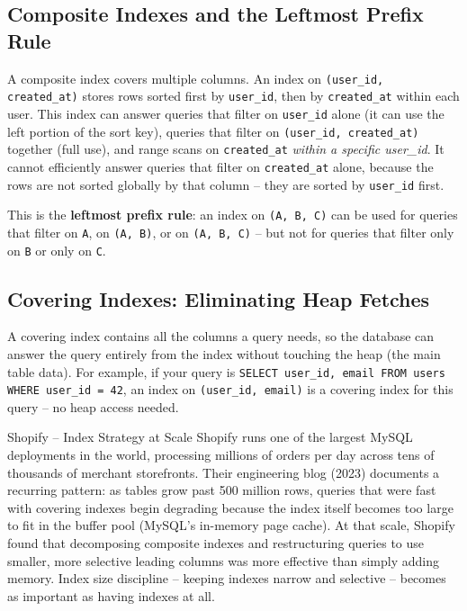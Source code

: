 \documentclass[11pt,a4paper]{article}
\begin{document}
\subsection{Composite Indexes and the Leftmost Prefix Rule}

A composite index covers multiple columns. An index on \texttt{(user\_id, created\_at)} stores rows sorted first by \texttt{user\_id}, then by \texttt{created\_at} within each user. This index can answer queries that filter on \texttt{user\_id} alone (it can use the left portion of the sort key), queries that filter on \texttt{(user\_id, created\_at)} together (full use), and range scans on \texttt{created\_at} \emph{within a specific user\_id}. It cannot efficiently answer queries that filter on \texttt{created\_at} alone, because the rows are not sorted globally by that column -- they are sorted by \texttt{user\_id} first.

This is the \textbf{leftmost prefix rule}: an index on \texttt{(A, B, C)} can be used for queries that filter on \texttt{A}, on \texttt{(A, B)}, or on \texttt{(A, B, C)} -- but not for queries that filter only on \texttt{B} or only on \texttt{C}.

\subsection{Covering Indexes: Eliminating Heap Fetches}

A covering index contains all the columns a query needs, so the database can answer the query entirely from the index without touching the heap (the main table data). For example, if your query is \texttt{SELECT user\_id, email FROM users WHERE user\_id = 42}, an index on \texttt{(user\_id, email)} is a covering index for this query -- no heap access needed.

\begin{industrybox}{Shopify -- Index Strategy at Scale}
Shopify runs one of the largest MySQL deployments in the world, processing millions of orders per day across tens of thousands of merchant storefronts. Their engineering blog (2023) documents a recurring pattern: as tables grow past 500 million rows, queries that were fast with covering indexes begin degrading because the index itself becomes too large to fit in the buffer pool (MySQL's in-memory page cache). At that scale, Shopify found that decomposing composite indexes and restructuring queries to use smaller, more selective leading columns was more effective than simply adding memory. Index size discipline -- keeping indexes narrow and selective -- becomes as important as having indexes at all.
\end{industrybox}
\end{document}

